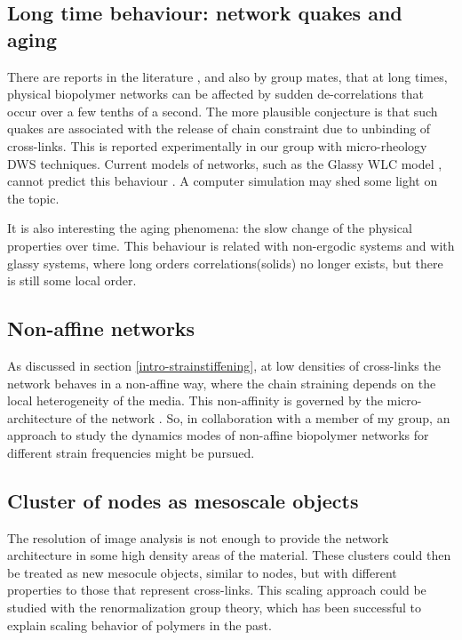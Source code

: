 
\subsection{Long time behaviour: network quakes and aging}
There are reports in the literature \citep{kajiya_slow_2013}, and also by group
mates\citep{vincent_micro-rheological_2013}, that at long times, physical
biopolymer networks can be affected by sudden de-correlations that occur over a
few tenths of a second. The more plausible conjecture is that such quakes are associated with the release of
chain constraint due to unbinding of cross-links.  This is reported
experimentally in our group  with micro-rheology DWS techniques.
Current models of networks, such as the Glassy WLC model
\citep{kroy_glassy_2007}, cannot predict this behaviour \citep{vincent_micro-rheological_2013}.  A
computer simulation may shed some light on the topic.

It is also interesting the aging phenomena: the slow change of the physical
properties over time. This behaviour is related with non-ergodic systems and
with glassy systems, where long orders correlations(solids) no longer exists,
but there is still some local order.\citep{cipelletti_slow_????}

\subsection{Non-affine networks}
As discussed in section \ref{intro-strainstiffening}, at low densities of
cross-links the network behaves in a non-affine way, where the chain
straining depends on the local heterogeneity of the media.
This non-affinity is governed by the micro-architecture of the network
\citep{head_deformation_2003,wilhelm_elasticity_2003,huisman_three-dimensional_2007,chandran_affine_2006}.
So, in collaboration with a member of my group, an approach to study the
dynamics modes of non-affine biopolymer networks for different strain
frequencies might be pursued.

\subsection{Cluster of nodes as mesoscale objects}
The resolution of image analysis is not enough to provide the network
architecture in some high density areas of the material. These clusters could
then be treated as new mesocule objects, similar to nodes, but with different
properties to those that represent cross-links. This scaling approach could be
studied with the renormalization group theory, which has been successful to
explain scaling behavior of polymers in the past.\citep{gennes_scaling_1979}


